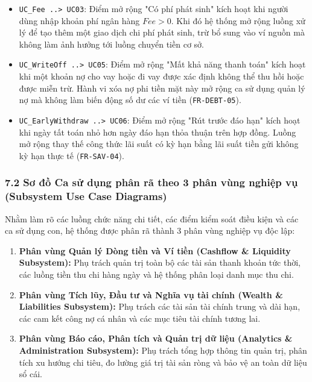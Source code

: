 \documentclass[11pt,a4paper]{article}
\providecommand{\tightlist}{
  \setlength{\itemsep}{0pt}\setlength{\parskip}{0pt}}
\begin{document}
\begin{enumerate}
  \begin{itemize}
  \tightlist
  \item
    \texttt{UC\_Fee\ ..\textgreater{}\ UC03}: Điểm mở rộng "Có phí phát
    sinh" kích hoạt khi người dùng nhập khoản phí ngân hàng \(Fee > 0\).
    Khi đó hệ thống mở rộng luồng xử lý để tạo thêm một giao dịch chi
    phí phát sinh, trừ bổ sung vào ví nguồn mà không làm ảnh hưởng tới
    luồng chuyển tiền cơ sở.
  \item
    \texttt{UC\_WriteOff\ ..\textgreater{}\ UC05}: Điểm mở rộng "Mất khả
    năng thanh toán" kích hoạt khi một khoản nợ cho vay hoặc đi vay được
    xác định không thể thu hồi hoặc được miễn trừ. Hành vi xóa nợ phi
    tiền mặt này mở rộng ca sử dụng quản lý nợ mà không làm biến động số
    dư các ví tiền (\texttt{FR-DEBT-05}).
  \item
    \texttt{UC\_EarlyWithdraw\ ..\textgreater{}\ UC06}: Điểm mở rộng
    "Rút trước đáo hạn" kích hoạt khi ngày tất toán nhỏ hơn ngày đáo hạn
    thỏa thuận trên hợp đồng. Luồng mở rộng thay thế công thức lãi suất
    có kỳ hạn bằng lãi suất tiền gửi không kỳ hạn thực tế
    (\texttt{FR-SAV-04}).
  \end{itemize}
\end{enumerate}

\subsubsection{7.2 Sơ đồ Ca sử dụng phân rã theo 3 phân vùng nghiệp vụ
(Subsystem Use Case
Diagrams)}\label{72-sux1a1-ux111ux1ed3-ca-sux1eed-dux1ee5ng-phuxe2n-ruxe3-theo-3-phuxe2n-vuxf9ng-nghiux1ec7p-vux1ee5-subsystem-use-case-diagrams}

Nhằm làm rõ các luồng chức năng chi tiết, các điểm kiểm soát điều kiện
và các ca sử dụng con, hệ thống được phân rã thành 3 phân vùng nghiệp vụ
độc lập:

\begin{enumerate}
\def\labelenumi{\arabic{enumi}.}
\tightlist
\item
  \textbf{Phân vùng Quản lý Dòng tiền và Ví tiền (Cashflow \& Liquidity
  Subsystem):} Phụ trách quản trị toàn bộ các tài sản thanh khoản tức
  thời, các luồng tiền thu chi hàng ngày và hệ thống phân loại danh mục
  thu chi.
\item
  \textbf{Phân vùng Tích lũy, Đầu tư và Nghĩa vụ tài chính (Wealth \&
  Liabilities Subsystem):} Phụ trách các tài sản tài chính trung và dài
  hạn, các cam kết công nợ cá nhân và các mục tiêu tài chính tương lai.
\item
  \textbf{Phân vùng Báo cáo, Phân tích và Quản trị dữ liệu (Analytics \&
  Administration Subsystem):} Phụ trách tổng hợp thông tin quản trị,
  phân tích xu hướng chi tiêu, đo lường giá trị tài sản ròng và bảo vệ
  an toàn dữ liệu sổ cái.
\end{enumerate}
\end{document}
